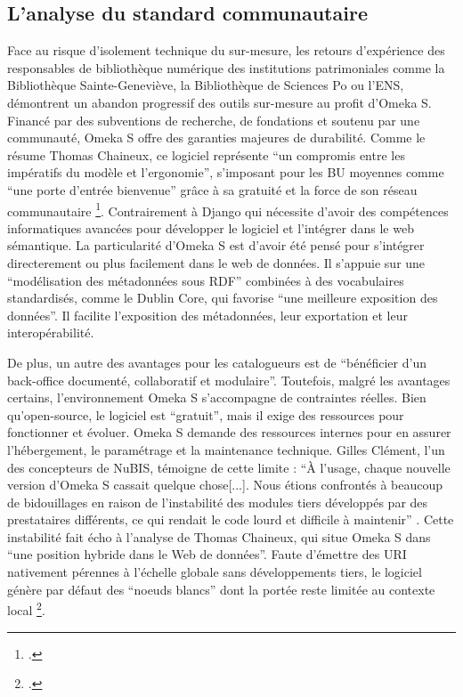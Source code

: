 \subsection{L'analyse du standard communautaire}
Face au risque d'isolement technique du sur-mesure, les retours d'expérience des responsables de bibliothèque numérique des institutions patrimoniales comme la Bibliothèque Sainte-Geneviève, la Bibliothèque de Sciences Po ou l'\ac{ENS}, démontrent un abandon progressif des outils sur-mesure au profit d'Omeka S. Financé par des subventions de recherche, de fondations et soutenu par une communauté, Omeka S offre des garanties majeures de durabilité. Comme le résume Thomas Chaineux, ce logiciel représente \enquote{un compromis entre les impératifs du modèle et l'ergonomie}, s'imposant pour les \ac{BU} moyennes comme \enquote{une porte d'entrée bienvenue} grâce à sa gratuité et la force de son réseau communautaire \footcite{chaineuxLentreeDansWeb}. Contrairement à Django qui nécessite d'avoir des compétences informatiques avancées pour développer le logiciel et l'intégrer dans le web sémantique. La particularité d'Omeka S est d'avoir été pensé pour s'intégrer directerement ou plus facilement dans le web de données. Il s'appuie sur une \enquote{modélisation des métadonnées sous \ac{RDF}} combinées à des vocabulaires standardisés, comme le Dublin Core, qui favorise \enquote{une meilleure exposition des données}. Il facilite l'exposition des métadonnées, leur exportation et leur interopérabilité. 
 
De plus, un autre des avantages pour les catalogueurs est de \enquote{bénéficier d'un back-office documenté, collaboratif et modulaire}. Toutefois, malgré les avantages certains, l'environnement Omeka S s'accompagne de contraintes réelles. Bien qu'open-source, le logiciel est \enquote{gratuit}, mais il exige des ressources pour fonctionner et évoluer. Omeka S demande des ressources internes pour en assurer l'hébergement, le paramétrage et la maintenance technique. Gilles Clément, l'un des concepteurs de NuBIS, témoigne de cette limite : \enquote{À l'usage, chaque nouvelle version d'Omeka S cassait quelque chose[...]. Nous étions confrontés à beaucoup de bidouillages en raison de l'instabilité des modules tiers développés par des prestataires différents, ce qui rendait le code lourd et difficile à maintenir} . Cette instabilité fait écho à l'analyse de Thomas Chaineux, qui situe Omeka S dans \enquote{une position hybride dans le Web de données}. Faute d'émettre des \ac{URI} nativement pérennes à l'échelle globale sans développements tiers, le logiciel génère par défaut des \enquote{noeuds blancs} dont la portée reste limitée au contexte local \footcite{chaineuxLentreeDansWeb}. 
 
